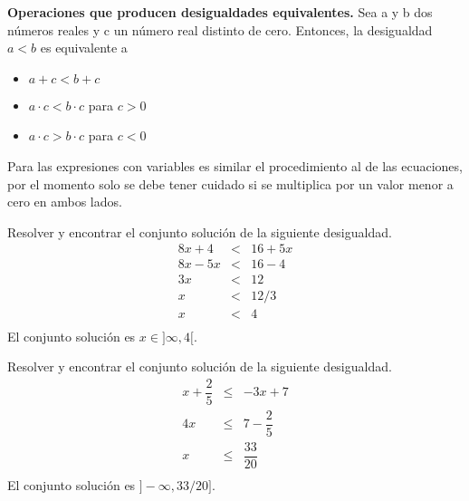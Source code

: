 \begin{myexample}
\textbf{Operaciones que producen desigualdades equivalentes.} Sea a y b dos números reales y c un número real distinto de cero. Entonces, la desigualdad $a<b$ es equivalente a
\begin{itemize}
	\item $a+c<b+c$
	\item $a\cdot c <b\cdot c $ para $c>0$
	\item $a\cdot c >b\cdot c $ para $c<0$
\end{itemize}
\end{myexample}
Para las expresiones con variables es similar el procedimiento al de las ecuaciones, por el momento solo se debe tener cuidado si se multiplica por un valor menor a cero en ambos lados.\\
\begin{myexample}
Resolver y encontrar el conjunto solución de la siguiente desigualdad.
\begin{eqnarray*}
8x+4&<&16+5x\\
8x-5x&<&16-4\\
3x&<&12\\
x&<&12/3\\
x&<&4\\
\end{eqnarray*}
El conjunto solución es $x\in ]\infty,4[$. 
\end{myexample}

\begin{myexample}
Resolver y encontrar el conjunto solución de la siguiente desigualdad.
\begin{eqnarray*}
x+\dfrac{2}{5} &\leq& -3x +7\\
4x &\leq&  7-\dfrac{2}{5}\\
x &\leq&  \dfrac{33}{20}\\
\end{eqnarray*}
El conjunto solución es $]-\infty,33/20]$.
\end{myexample}

